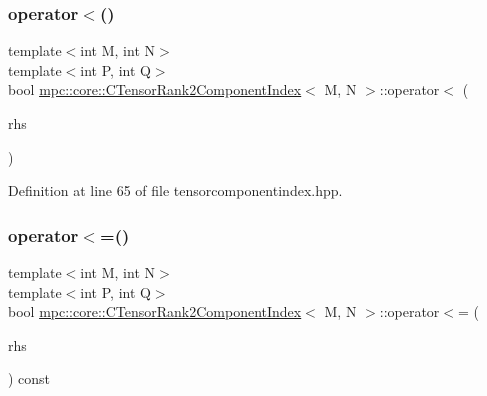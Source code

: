 \subsubsection{\texorpdfstring{operator$<$()}{operator<()}}
{\footnotesize\ttfamily template$<$int M, int N$>$ \\
template$<$int P, int Q$>$ \\
bool \mbox{\hyperlink{classmpc_1_1core_1_1_c_tensor_rank2_component_index}{mpc\+::core\+::\+C\+Tensor\+Rank2\+Component\+Index}}$<$ M, N $>$\+::operator$<$ (\begin{DoxyParamCaption}\item[{const \mbox{\hyperlink{classmpc_1_1core_1_1_c_tensor_rank2_component_index}{C\+Tensor\+Rank2\+Component\+Index}}$<$ P, Q $>$ \&}]{rhs }\end{DoxyParamCaption})\hspace{0.3cm}{\ttfamily [inline]}}



Definition at line 65 of file tensorcomponentindex.\+hpp.

\mbox{\label{classmpc_1_1core_1_1_c_tensor_rank2_component_index_ad034cd6d15be78437e9036767ecc2986}} 
\subsubsection{\texorpdfstring{operator$<$=()}{operator<=()}}
{\footnotesize\ttfamily template$<$int M, int N$>$ \\
template$<$int P, int Q$>$ \\
bool \mbox{\hyperlink{classmpc_1_1core_1_1_c_tensor_rank2_component_index}{mpc\+::core\+::\+C\+Tensor\+Rank2\+Component\+Index}}$<$ M, N $>$\+::operator$<$= (\begin{DoxyParamCaption}\item[{const \mbox{\hyperlink{classmpc_1_1core_1_1_c_tensor_rank2_component_index}{C\+Tensor\+Rank2\+Component\+Index}}$<$ P, Q $>$ \&}]{rhs }\end{DoxyParamCaption}) const\hspace{0.3cm}{\ttfamily [inline]}}



